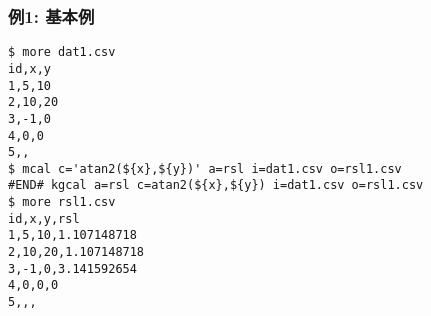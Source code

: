 \subsubsection*{例1: 基本例}



\begin{Verbatim}[baselinestretch=0.7,frame=single]
$ more dat1.csv
id,x,y
1,5,10
2,10,20
3,-1,0
4,0,0
5,,
$ mcal c='atan2(${x},${y})' a=rsl i=dat1.csv o=rsl1.csv
#END# kgcal a=rsl c=atan2(${x},${y}) i=dat1.csv o=rsl1.csv
$ more rsl1.csv
id,x,y,rsl
1,5,10,1.107148718
2,10,20,1.107148718
3,-1,0,3.141592654
4,0,0,0
5,,,
\end{Verbatim}

